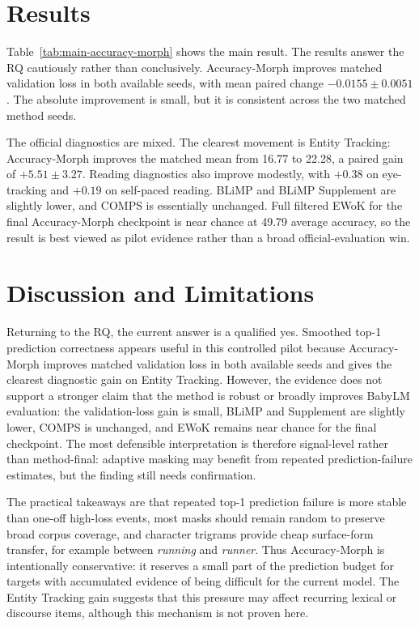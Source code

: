 \documentclass[11pt]{article}
\begin{document}
\section{Results}

Table~\ref{tab:main-accuracy-morph} shows the main result.
The results answer the RQ cautiously rather than conclusively.
Accuracy-Morph improves matched validation loss in both available seeds, with mean paired change $-0.0155 \pm 0.0051$.
The absolute improvement is small, but it is consistent across the two matched method seeds.

The official diagnostics are mixed.
The clearest movement is Entity Tracking: Accuracy-Morph improves the matched mean from 16.77 to 22.28, a paired gain of $+5.51 \pm 3.27$.
Reading diagnostics also improve modestly, with $+0.38$ on eye-tracking and $+0.19$ on self-paced reading.
BLiMP and BLiMP Supplement are slightly lower, and COMPS is essentially unchanged.
Full filtered EWoK for the final Accuracy-Morph checkpoint is near chance at 49.79 average accuracy, so the result is best viewed as pilot evidence rather than a broad official-evaluation win.

\section{Discussion and Limitations}

Returning to the RQ, the current answer is a qualified yes.
Smoothed top-1 prediction correctness appears useful in this controlled pilot because Accuracy-Morph improves matched validation loss in both available seeds and gives the clearest diagnostic gain on Entity Tracking.
However, the evidence does not support a stronger claim that the method is robust or broadly improves BabyLM evaluation: the validation-loss gain is small, BLiMP and Supplement are slightly lower, COMPS is unchanged, and EWoK remains near chance for the final checkpoint.
The most defensible interpretation is therefore signal-level rather than method-final: adaptive masking may benefit from repeated prediction-failure estimates, but the finding still needs confirmation.

The practical takeaways are that repeated top-1 prediction failure is more stable than one-off high-loss events, most masks should remain random to preserve broad corpus coverage, and character trigrams provide cheap surface-form transfer, for example between \textit{running} and \textit{runner}.
Thus Accuracy-Morph is intentionally conservative: it reserves a small part of the prediction budget for targets with accumulated evidence of being difficult for the current model.
The Entity Tracking gain suggests that this pressure may affect recurring lexical or discourse items, although this mechanism is not proven here.
\end{document}
